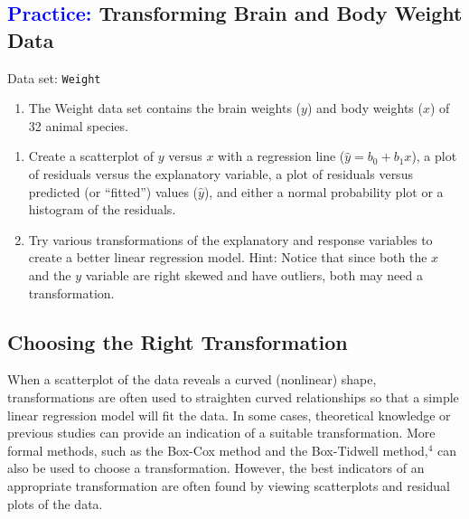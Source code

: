 \documentclass[
]{report}
\providecommand{\tightlist}{%
  \setlength{\itemsep}{0pt}\setlength{\parskip}{0pt}}
\begin{document}
\hypertarget{transforming-brain-and-body-weight-data}{%
\subsection*{\texorpdfstring{\textcolor{blue}{Practice:} Transforming Brain and Body Weight Data}{ Transforming Brain and Body Weight Data}}\label{transforming-brain-and-body-weight-data}}

\vspace{-1em}

Data set: \texttt{Weight}

\begin{enumerate}
\def\labelenumi{\arabic{enumi}.}
\setcounter{enumi}{31}
\tightlist
\item
  The Weight data set contains the brain weights (\(\scriptstyle y\)) and body weights (\(\scriptstyle x\)) of 32 animal species.
\end{enumerate}

\begin{enumerate}
\def\labelenumi{(\alph{enumi})}
\item
  Create a scatterplot of \(\scriptstyle y\) versus \(\scriptstyle x\) with a regression line (\(\scriptstyle \hat{y} = b_0 + b_1x\)), a plot of residuals versus the explanatory variable, a plot of residuals versus predicted (or ``fitted'') values (\(\scriptstyle \hat{y}\)), and either a normal probability plot or a histogram of the residuals.
\item
  Try various transformations of the explanatory and response variables to create a better linear regression model. Hint: Notice that since both the \(\scriptstyle x\) and the \(\scriptstyle y\) variable are right skewed and have outliers, both may need a transformation.
\end{enumerate}

\hypertarget{choosing-the-right-transformation}{%
\subsection*{Choosing the Right Transformation}\label{choosing-the-right-transformation}}

When a scatterplot of the data reveals a curved (nonlinear) shape, transformations are often used to straighten curved relationships so that a simple linear regression model will fit the data. In some cases, theoretical knowledge or previous studies can provide an indication of a suitable transformation. More formal methods, such as the Box-Cox method and the Box-Tidwell method,\(^4\) can also be used to choose a transformation. However, the best indicators of an appropriate transformation are often found by viewing scatterplots and residual plots of the data.
\end{document}
